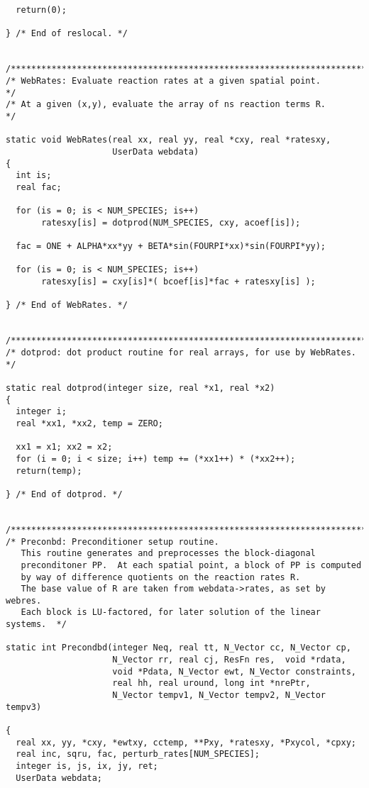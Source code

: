 \documentclass[11pt]{article}
\begin{document}
\begin{verbatim}
  return(0);

} /* End of reslocal. */


/*************************************************************************/
/* WebRates: Evaluate reaction rates at a given spatial point.           */
/* At a given (x,y), evaluate the array of ns reaction terms R.          */

static void WebRates(real xx, real yy, real *cxy, real *ratesxy,
                     UserData webdata)
{
  int is;
  real fac;

  for (is = 0; is < NUM_SPECIES; is++)
       ratesxy[is] = dotprod(NUM_SPECIES, cxy, acoef[is]);

  fac = ONE + ALPHA*xx*yy + BETA*sin(FOURPI*xx)*sin(FOURPI*yy);

  for (is = 0; is < NUM_SPECIES; is++)
       ratesxy[is] = cxy[is]*( bcoef[is]*fac + ratesxy[is] );

} /* End of WebRates. */


/*************************************************************************/
/* dotprod: dot product routine for real arrays, for use by WebRates.    */

static real dotprod(integer size, real *x1, real *x2)
{
  integer i;
  real *xx1, *xx2, temp = ZERO;

  xx1 = x1; xx2 = x2;
  for (i = 0; i < size; i++) temp += (*xx1++) * (*xx2++);
  return(temp);

} /* End of dotprod. */


/*************************************************************************/
/* Preconbd: Preconditioner setup routine.
   This routine generates and preprocesses the block-diagonal
   preconditoner PP.  At each spatial point, a block of PP is computed
   by way of difference quotients on the reaction rates R.
   The base value of R are taken from webdata->rates, as set by webres.
   Each block is LU-factored, for later solution of the linear systems.  */

static int Precondbd(integer Neq, real tt, N_Vector cc, N_Vector cp,
                     N_Vector rr, real cj, ResFn res,  void *rdata,
                     void *Pdata, N_Vector ewt, N_Vector constraints,
                     real hh, real uround, long int *nrePtr, 
                     N_Vector tempv1, N_Vector tempv2, N_Vector tempv3)

{
  real xx, yy, *cxy, *ewtxy, cctemp, **Pxy, *ratesxy, *Pxycol, *cpxy;
  real inc, sqru, fac, perturb_rates[NUM_SPECIES];
  integer is, js, ix, jy, ret;
  UserData webdata;


\end{verbatim}
\end{document}
